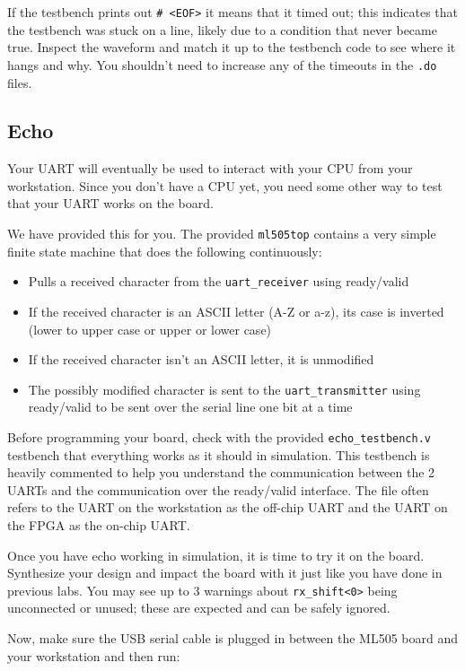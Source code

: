 \documentclass[11pt]{article}
\begin{document}
If the testbench prints out \verb|# <EOF>| it means that it timed out; this indicates that the testbench was stuck on a line, likely due to a condition that never became true. Inspect the waveform and match it up to the testbench code to see where it hangs and why. You shouldn't need to increase any of the timeouts in the \verb|.do| files.

\subsection{Echo}
Your UART will eventually be used to interact with your CPU from your workstation. Since you don't have a CPU yet, you need some other way to test that your UART works on the board.

We have provided this for you. The provided \verb|ml505top| contains a very simple finite state machine that does the following continuously:

\begin{itemize}
	\item Pulls a received character from the \verb|uart_receiver| using ready/valid
	\item If the received character is an ASCII letter (A-Z or a-z), its case is inverted (lower to upper case or upper or lower case)
	\item If the received character isn't an ASCII letter, it is unmodified
	\item The possibly modified character is sent to the \verb|uart_transmitter| using ready/valid to be sent over the serial line one bit at a time
\end{itemize}

Before programming your board, check with the provided \verb|echo_testbench.v| testbench that everything works as it should in simulation. This testbench is heavily commented to help you understand the communication between the 2 UARTs and the communication over the ready/valid interface. The file often refers to the UART on the workstation as the off-chip UART and the UART on the FPGA as the on-chip UART.

Once you have echo working in simulation, it is time to try it on the board. Synthesize your design and impact the board with it just like you have done in previous labs. You may see up to 3 warnings about \verb|rx_shift<0>| being unconnected or unused; these are expected and can be safely ignored.

Now, make sure the USB serial cable is plugged in between the ML505 board and your workstation and then run:
\end{document}
